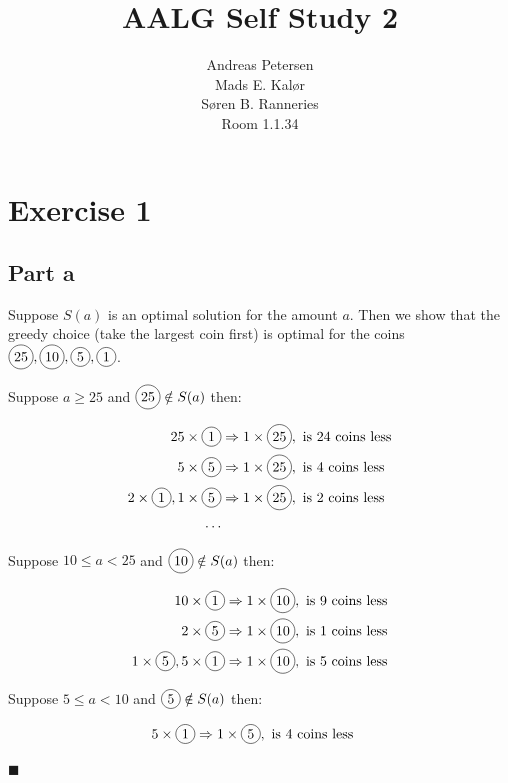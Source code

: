 \documentclass[koma,a4paper]{article}
\title{AALG Self Study 2}
\author{Andreas Petersen\\
Mads E. Kalør\\
Søren B. Ranneries\\
Room 1.1.34}
\newcommand*\circled[1]{\tikz[baseline=(char.base)]{\node[shape=circle,draw,inner sep=2pt] (char) {#1};}} %
\begin{document}
\maketitle

\pagebreak

\section{Exercise 1}

\subsection{Part a}
Suppose $S(a)$ is an optimal solution for the amount $a$. Then we show that the greedy choice (take the largest coin first) is optimal for the coins $\circled{25}, \circled{10}, \circled{5}, \circled{1}$.

Suppose $a \geq 25$ and $\circled{25} \notin S(a)$ then:

\begin{align*}
  25 \times \circled{1} &\Rightarrow 1 \times \circled{25}, \text{ is } 24 \text{ coins less}\\
  5 \times \circled{5} &\Rightarrow 1 \times \circled{25}, \text{ is } 4 \text{ coins less}\\
  2 \times \circled{1}, 1 \times \circled{5} &\Rightarrow 1 \times \circled{25}, \text{ is } 2 \text{ coins less}\\
  \dots
\end{align*}

Suppose $10 \leq a < 25$ and $\circled{10} \notin S(a)$ then:

\begin{align*}
  10 \times \circled{1} &\Rightarrow 1 \times \circled{10}, \text{ is } 9 \text{ coins less}\\
  2 \times \circled{5} &\Rightarrow 1 \times \circled{10}, \text{ is } 1 \text{ coins less}\\
  1 \times \circled{5}, 5 \times \circled{1} &\Rightarrow 1 \times \circled{10}, \text{ is } 5 \text{ coins less}
\end{align*}

Suppose $5 \leq a < 10$ and $\circled{5} \notin S(a)$ then:

\begin{align*}
  5 \times \circled{1} &\Rightarrow 1 \times \circled{5}, \text{ is } 4 \text{ coins less}
\end{align*}

\hfill\ensuremath{\blacksquare}
\end{document}
